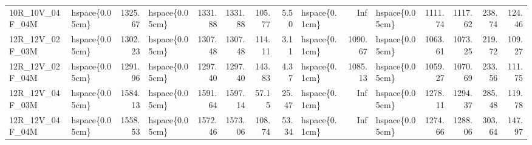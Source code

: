 \begin{tabular}{llrlrrrrlrlrrrr}
10R\_10V\_04F\_04M & hspace\{0.05cm\} & 1325.67 & hspace\{0.05cm\} & 1331.88 & 1331.88 & 105.77 & 5.50 & hspace\{0.1cm\} & Inf & hspace\{0.05cm\} & 1111.74 & 1117.62 & 238.74 & 124.46\\
\addlinespace
12R\_12V\_02F\_03M & hspace\{0.05cm\} & 1302.23 & hspace\{0.05cm\} & 1307.48 & 1307.48 & 114.11 & 3.11 & hspace\{0.1cm\} & 1090.67 & hspace\{0.05cm\} & 1063.61 & 1073.25 & 219.72 & 109.27\\
12R\_12V\_02F\_04M & hspace\{0.05cm\} & 1291.96 & hspace\{0.05cm\} & 1297.40 & 1297.40 & 143.83 & 4.37 & hspace\{0.1cm\} & 1085.13 & hspace\{0.05cm\} & 1059.27 & 1070.69 & 233.56 & 111.75\\
12R\_12V\_04F\_03M & hspace\{0.05cm\} & 1584.13 & hspace\{0.05cm\} & 1591.64 & 1597.14 & 57.15 & 25.47 & hspace\{0.1cm\} & Inf & hspace\{0.05cm\} & 1278.11 & 1294.37 & 285.48 & 119.78\\
12R\_12V\_04F\_04M & hspace\{0.05cm\} & 1558.53 & hspace\{0.05cm\} & 1572.46 & 1573.06 & 108.74 & 53.34 & hspace\{0.1cm\} & Inf & hspace\{0.05cm\} & 1274.66 & 1288.06 & 303.64 & 147.97\\
\bottomrule
\end{tabular}
